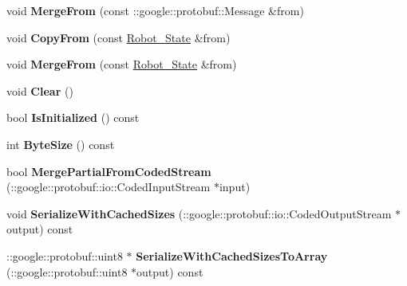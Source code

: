 \begin{DoxyCompactItemize}
\item 
void {\bfseries Merge\+From} (const \+::google\+::protobuf\+::\+Message \&from)\hypertarget{classvss__state_1_1Robot__State_a5f5cb63411c8f37399dfd169c94e6e54}{}\label{classvss__state_1_1Robot__State_a5f5cb63411c8f37399dfd169c94e6e54}

\item 
void {\bfseries Copy\+From} (const \hyperlink{classvss__state_1_1Robot__State}{Robot\+\_\+\+State} \&from)\hypertarget{classvss__state_1_1Robot__State_a4e18e564b9c470d6f382c8c1c040cfb4}{}\label{classvss__state_1_1Robot__State_a4e18e564b9c470d6f382c8c1c040cfb4}

\item 
void {\bfseries Merge\+From} (const \hyperlink{classvss__state_1_1Robot__State}{Robot\+\_\+\+State} \&from)\hypertarget{classvss__state_1_1Robot__State_a66fadfccfb89ba8742bafa6cd9597420}{}\label{classvss__state_1_1Robot__State_a66fadfccfb89ba8742bafa6cd9597420}

\item 
void {\bfseries Clear} ()\hypertarget{classvss__state_1_1Robot__State_a78f3f24cbb0f2e1fac867550bf05da91}{}\label{classvss__state_1_1Robot__State_a78f3f24cbb0f2e1fac867550bf05da91}

\item 
bool {\bfseries Is\+Initialized} () const \hypertarget{classvss__state_1_1Robot__State_ae482d98ba51e51887efe37a4d2f6abb5}{}\label{classvss__state_1_1Robot__State_ae482d98ba51e51887efe37a4d2f6abb5}

\item 
int {\bfseries Byte\+Size} () const \hypertarget{classvss__state_1_1Robot__State_a6ff13cd34434ab985d2b560a13219532}{}\label{classvss__state_1_1Robot__State_a6ff13cd34434ab985d2b560a13219532}

\item 
bool {\bfseries Merge\+Partial\+From\+Coded\+Stream} (\+::google\+::protobuf\+::io\+::\+Coded\+Input\+Stream $\ast$input)\hypertarget{classvss__state_1_1Robot__State_a82a0f5270a13c5211d94c6da6726ab8d}{}\label{classvss__state_1_1Robot__State_a82a0f5270a13c5211d94c6da6726ab8d}

\item 
void {\bfseries Serialize\+With\+Cached\+Sizes} (\+::google\+::protobuf\+::io\+::\+Coded\+Output\+Stream $\ast$output) const \hypertarget{classvss__state_1_1Robot__State_a67b812e24a55cdfad4d58049f8e0e674}{}\label{classvss__state_1_1Robot__State_a67b812e24a55cdfad4d58049f8e0e674}

\item 
\+::google\+::protobuf\+::uint8 $\ast$ {\bfseries Serialize\+With\+Cached\+Sizes\+To\+Array} (\+::google\+::protobuf\+::uint8 $\ast$output) const \hypertarget{classvss__state_1_1Robot__State_a2a833a548c45c6e25eaba0e9855ed563}{}\label{classvss__state_1_1Robot__State_a2a833a548c45c6e25eaba0e9855ed563}


\end{DoxyCompactItemize}
